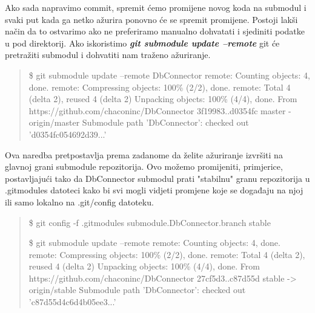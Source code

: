 \documentclass {article}
\begin{document}
\begin{enumerate}
\begin{enumerate}
Ako sada napravimo commit, spremit ćemo promijene novog koda na submodul i svaki put kada ga netko ažurira ponovno će se spremit promijene.
\newline Postoji lakši način da to ostvarimo ako ne preferiramo manualno dohvatati i sjediniti podatke u pod direktorij. Ako iskoristimo \textbf{\emph{git submodule update --remote}} git će pretražiti submodul i dohvatiti nam traženo ažuriranje.
\newline 
\begin{quote}
    \$ git submodule update --remote DbConnector
\newline remote: Counting objects: 4, done.
\newline remote: Compressing objects: 100\% (2/2), done.
\newline remote: Total 4 (delta 2), reused 4 (delta 2)
\newline Unpacking objects: 100\% (4/4), done.
\newline From https://github.com/chaconinc/DbConnector
\newline         3f19983..d0354fc  master     - origin/master
\newline Submodule path 'DbConnector': checked out 'd0354fc054692d39...'
\newline
\end{quote}
Ova naredba pretpostavlja prema zadanome da želite ažuriranje izvršiti na glavnoj grani submodule repozitorija. Ovo možemo promijeniti, primjerice, postavljajući tako da DbConnector submodul prati "stabilnu" granu repozitorija u .gitmodules datoteci kako bi svi mogli vidjeti promjene koje se događaju na njoj ili samo lokalno na .git/config datoteku.
\newline
    \begin{quote}
        \$ git config -f .gitmodules submodule.DbConnector.branch stable

\$ git submodule update --remote
\newline remote: Counting objects: 4, done.
\newline remote: Compressing objects: 100\% (2/2), done.
\newline remote: Total 4 (delta 2), reused 4 (delta 2)
\newline Unpacking objects: 100\% (4/4), done.
\newline From https://github.com/chaconinc/DbConnector
\newline 27cf5d3..c87d55d  stable -> origin/stable
\newline Submodule path 'DbConnector': checked out 'c87d55d4c6d4b05ee3...'
    \end{quote}
\newpage


\end{enumerate}
\end{enumerate}
\end{document}
